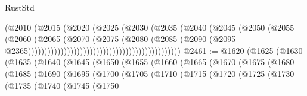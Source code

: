 \begin{lexlean}{RustStd}
\begin{coremodule}
                                                              (@2010
                                                                (@2015
                                                                  (@2020
                                                                    (@2025
                                                                      (@2030
                                                                        (@2035
                                                                          (@2040
                                                                            (@2045
                                                                              (@2050
                                                                                (@2055
                                                                                  (@2060
                                                                                    (@2065
                                                                                      (@2070
                                                                                        (@2075
                                                                                          (@2080
                                                                                            (@2085
                                                                                              (@2090
                                                                                                (@2095
                                                                                                  @2365)))))))))))))))))))))))))))))))))))))))))))))))
@2461 := @1620
    (@1625
      (@1630
        (@1635
          (@1640
            (@1645
              (@1650
                (@1655
                  (@1660
                    (@1665
                      (@1670
                        (@1675
                          (@1680
                            (@1685
                              (@1690
                                (@1695
                                  (@1700
                                    (@1705
                                      (@1710
                                        (@1715
                                          (@1720
                                            (@1725
                                              (@1730
                                                (@1735
                                                  (@1740
                                                    (@1745
                                                      (@1750

\end{coremodule}
\end{lexlean}
